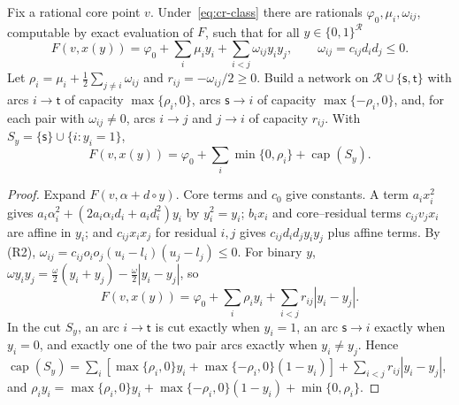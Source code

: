 \begin{proposition}\label{prop:cr-cut}
Fix a rational core point $v$. Under~\eqref{eq:cr-class} there are rationals
$\varphi_0,\mu_i,\omega_{ij}$, computable by exact evaluation of $F$, such
that for all $y\in\{0,1\}^{\mathcal R}$
\[
F(v,x(y))=\varphi_0+\sum_{i}\mu_iy_i+\sum_{i<j}\omega_{ij}y_iy_j,
\qquad \omega_{ij}=c_{ij}d_id_j\le0 .
\]
Let $\rho_i=\mu_i+\frac12\sum_{j\ne i}\omega_{ij}$ and
$r_{ij}=-\omega_{ij}/2\ge0$. Build a network on
$\mathcal R\cup\{\mathsf s,\mathsf t\}$ with arcs $i\to\mathsf t$ of
capacity $\max\{\rho_i,0\}$, arcs $\mathsf s\to i$ of capacity
$\max\{-\rho_i,0\}$, and, for each pair with $\omega_{ij}\ne0$, arcs
$i\to j$ and $j\to i$ of capacity $r_{ij}$. With
$S_y=\{\mathsf s\}\cup\{i:y_i=1\}$,
\begin{equation}\label{eq:cr-cutid}
F(v,x(y))=\varphi_0+\sum_i\min\{0,\rho_i\}+\operatorname{cap}(S_y).
\end{equation}
\end{proposition}
\begin{proof}
Expand $F(v,\alpha+d\circ y)$. Core terms and $c_0$ give constants. A term
$a_ix_i^2$ gives $a_i\alpha_i^2+(2a_i\alpha_id_i+a_id_i^2)y_i$ by
$y_i^2=y_i$; $b_ix_i$ and core--residual terms $c_{ij}v_jx_i$ are affine
in $y_i$; and $c_{ij}x_ix_j$ for residual $i,j$ gives
$c_{ij}d_id_jy_iy_j$ plus affine terms. By (R2),
$\omega_{ij}=c_{ij}o_io_j(u_i-l_i)(u_j-l_j)\le0$. For binary $y$,
$\omega y_iy_j=\frac\omega2(y_i+y_j)-\frac\omega2|y_i-y_j|$, so
\[
F(v,x(y))=\varphi_0+\sum_i\rho_iy_i+\sum_{i<j}r_{ij}|y_i-y_j| .
\]
In the cut $S_y$, an arc $i\to\mathsf t$ is cut exactly when $y_i=1$, an
arc $\mathsf s\to i$ exactly when $y_i=0$, and exactly one of the two pair
arcs exactly when $y_i\ne y_j$. Hence
$\operatorname{cap}(S_y)=\sum_i[\max\{\rho_i,0\}y_i+\max\{-\rho_i,0\}(1-y_i)]
+\sum_{i<j}r_{ij}|y_i-y_j|$, and
$\rho_iy_i=\max\{\rho_i,0\}y_i+\max\{-\rho_i,0\}(1-y_i)+\min\{0,\rho_i\}$.
\end{proof}

